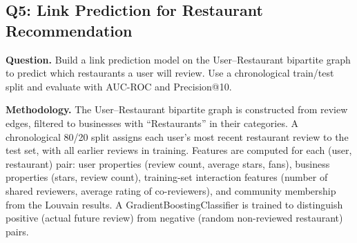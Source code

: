 \documentclass[11pt]{article}
\begin{document}
\clearpage
\subsection{Q5: Link Prediction for Restaurant Recommendation}

\textbf{Question.} Build a link prediction model on the User--Restaurant bipartite graph to predict which restaurants a user will review. Use a chronological train/test split and evaluate with AUC-ROC and Precision@10.

\textbf{Methodology.} The User--Restaurant bipartite graph is constructed from review edges, filtered to businesses with ``Restaurants'' in their categories. A chronological 80/20 split assigns each user's most recent restaurant review to the test set, with all earlier reviews in training. Features are computed for each (user, restaurant) pair: user properties (review count, average stars, fans), business properties (stars, review count), training-set interaction features (number of shared reviewers, average rating of co-reviewers), and community membership from the Louvain results. A GradientBoostingClassifier is trained to distinguish positive (actual future review) from negative (random non-reviewed restaurant) pairs.
\end{document}
